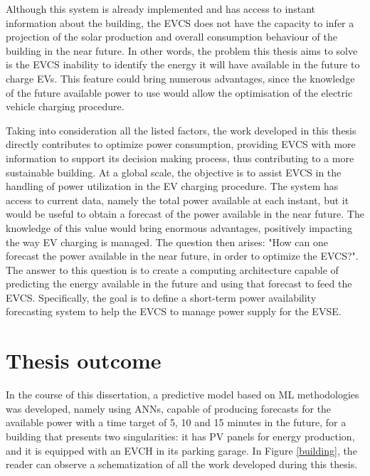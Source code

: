 Although this system is already implemented and has access to instant information about the building, the \ac{EVCS} does not have the capacity to infer a projection of the solar production and overall consumption behaviour of the building in the near future. In other words, the problem this thesis aims to solve is the \ac{EVCS} inability to identify the energy it will have available in the future to charge \ac{EV}s. This feature could bring numerous advantages, since the knowledge of the future available power to use would allow the optimisation of the electric vehicle charging procedure.


Taking into consideration all the listed factors, the work developed in this thesis directly contributes to optimize power consumption, providing \ac{EVCS} with more information to support its decision making process, thus contributing to a more sustainable building. At a global scale, the objective is to assist \ac{EVCS} in the handling of power utilization in the \ac{EV} charging procedure. The system has access to current data, namely the total power available at each instant, but it would be useful to obtain a forecast of the power available in the near future. The knowledge of this value would bring enormous advantages, positively impacting the way \ac{EV} charging is managed. The question then arises: "How can one forecast the power available in the near future, in order to optimize the \ac{EVCS}?". The answer to this question is to create a computing architecture capable of predicting the energy available in the future and using that forecast to feed the \ac{EVCS}. Specifically, the goal is to define a short-term power availability forecasting system to help the \ac{EVCS} to manage power supply for the \ac{EVSE}. 





\section{Thesis outcome}

In the course of this dissertation, a predictive model based on \ac{ML} methodologies was developed, namely using \ac{ANNs}, capable of producing forecasts for the available power with a time target of 5, 10 and 15 minutes in the future, for a building that presents two singularities: it has \ac{PV} panels for energy production, and it is equipped with an \ac{EVCH} in its parking garage. In Figure \ref{building}, the reader can observe a schematization of all the work developed during this thesis. 

